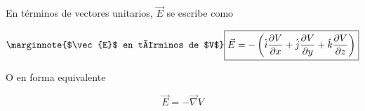 En términos de vectores unitarios, $\vec{E}$ se escribe como

\begin{equation}\label{23.20}\marginnote{$\vec{E}$ en términos de $V$}
\boxed{\vec{E}=-\left(\hat{i}\frac{\partial V}{\partial x}+\hat{j}\frac{\partial V}{\partial y}+\hat{k}\frac{\partial V}{\partial z}\right)}
\end{equation}

O en forma equivalente

\begin{equation}\label{23.22}
\vec{E}=-\vec{\nabla} V
\end{equation}













































